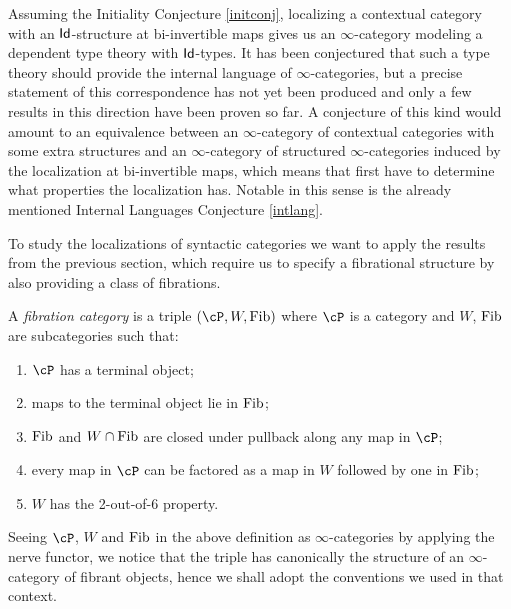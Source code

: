 \begin{rmk}
  Assuming the Initiality Conjecture \ref{initconj}, localizing a contextual
  category with an
  $\operatorname{\mathsf{Id}}$-structure at bi-invertible maps gives us an $\infty$-category modeling a
  dependent type theory with $\operatorname{\mathsf{Id}}$-types. It has been conjectured that such a
  type theory should provide the internal language of $\infty$-categories, but a
  precise statement of this correspondence has not yet been produced and only a
  few results in this direction have been proven so far. A conjecture of this kind
  would amount to an equivalence between an $\infty$-category of contextual
  categories with some extra structures and an $\infty$-category of structured
  $\infty$-categories induced by the localization at bi-invertible maps, which
  means that first have to determine what properties the localization has. Notable
  in this sense is the already mentioned Internal Languages Conjecture
  \ref{intlang}.
\end{rmk}

\noindent
To study the localizations of syntactic categories we want to apply
the results from the previous section, which require us to specify a
fibrational structure by also providing a class
of fibrations.

\begin{defn}\label{fibcats}
  A \emph{fibration category} is a triple $(\cP,W,\fib)$ where $\cP$ is a
  category and $W$, $\operatorname{Fib}$ are subcategories such that:
  \begin{enumerate}
    \item $\cP$ has a terminal object;
    \item maps to the terminal object lie in $\operatorname{Fib}$;
    \item $\operatorname{Fib}$ and $W\cap \operatorname{Fib}$ are closed under pullback along any map in $\cP$;
    \item every map in $\cP$ can be factored as a map in $W$ followed by one in
      $\operatorname{Fib}$;
    \item $W$ has the 2-out-of-6 property.
  \end{enumerate}
\end{defn}

\begin{rmk}
  Seeing $\cP$, $W$ and $\operatorname{Fib}$ in the above definition as $\infty$-categories by
  applying the nerve functor, we
  notice that the triple has canonically the structure of an $\infty$-category
  of fibrant objects, hence we shall adopt the conventions we used in that
  context.
\end{rmk}

